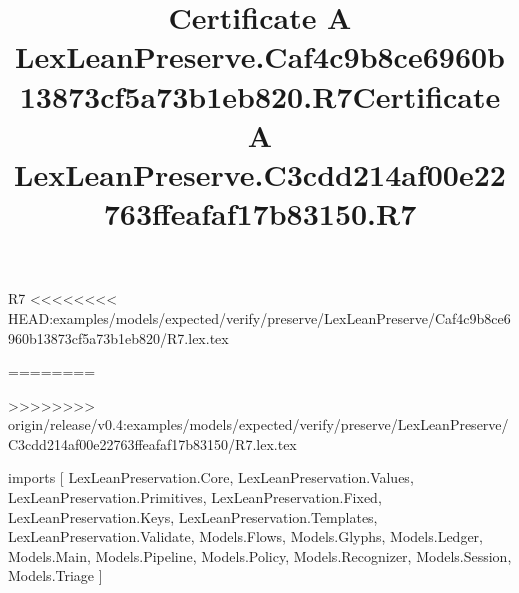 \begin{lexlean}{R7}
<<<<<<<< HEAD:examples/models/expected/verify/preserve/LexLeanPreserve/Caf4c9b8ce6960b13873cf5a73b1eb820/R7.lex.tex
\title{Certificate A LexLeanPreserve.Caf4c9b8ce6960b13873cf5a73b1eb820.R7}
========
\title{Certificate A LexLeanPreserve.C3cdd214af00e22763ffeafaf17b83150.R7}
>>>>>>>> origin/release/v0.4:examples/models/expected/verify/preserve/LexLeanPreserve/C3cdd214af00e22763ffeafaf17b83150/R7.lex.tex
\begin{coremodule}
imports [
  LexLeanPreservation.Core,
  LexLeanPreservation.Values,
  LexLeanPreservation.Primitives,
  LexLeanPreservation.Fixed,
  LexLeanPreservation.Keys,
  LexLeanPreservation.Templates,
  LexLeanPreservation.Validate,
  Models.Flows,
  Models.Glyphs,
  Models.Ledger,
  Models.Main,
  Models.Pipeline,
  Models.Policy,
  Models.Recognizer,
  Models.Session,
  Models.Triage
]


\end{coremodule}
\end{lexlean}
